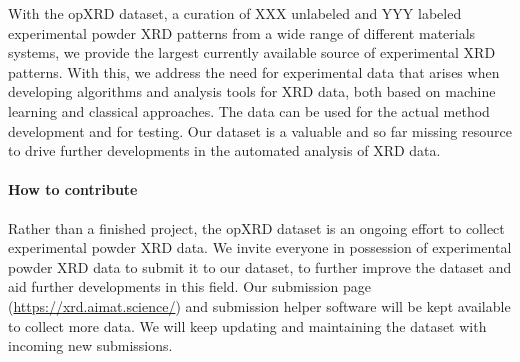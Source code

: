With the opXRD dataset, a curation of XXX unlabeled and YYY labeled experimental powder XRD patterns from a wide range of different materials systems, we provide the largest currently available source of experimental XRD patterns. With this, we address the need for experimental data that arises when developing algorithms and analysis tools for XRD data, both based on machine learning and classical approaches. The data can be used for the actual method development and for testing. Our dataset is a valuable and so far missing resource to drive further developments in the automated analysis of XRD data.

\paragraph{How to contribute}

Rather than a finished project, the opXRD dataset is an ongoing effort to collect experimental powder XRD data. We invite everyone in possession of experimental powder XRD data to submit it to our dataset, to further improve the dataset and aid further developments in this field. Our submission page (\url{https://xrd.aimat.science/}) and submission helper software will be kept available to collect more data. We will keep updating and maintaining the dataset with incoming new submissions.


